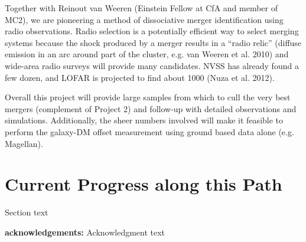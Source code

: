 Together with Reinout van Weeren (Einstein Fellow at CfA and member of MC2), we are pioneering a method of dissociative merger identification using radio observations.  Radio selection is a potentially efficient way to select merging systems because the shock produced by a merger results in a ``radio relic'' (diffuse emission in an arc around part of the cluster, e.g. van Weeren et al. 2010) and wide-area radio surveys will provide many candidates. NVSS has already found a few dozen, and LOFAR is projected to find about 1000 (Nuza et al. 2012).

Overall this project will provide large samples from which to cull the very best mergers (complement of Project 2) and follow-up with detailed observations and simulations.  Additionally, the sheer numbers involved will make it feasible to perform the galaxy-DM offset measurement using ground based data alone (e.g. Magellan).

\section{Current Progress along this Path}

Section text


\textbf{acknowledgements:}
Acknowledgment text

%



%
%  
